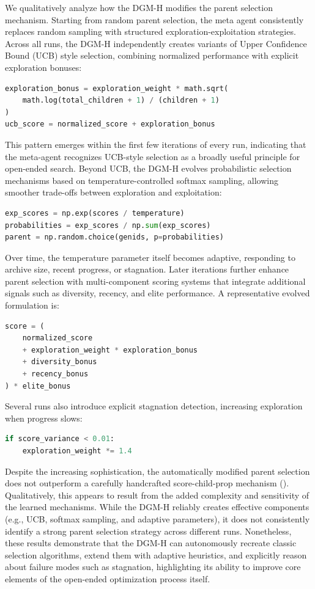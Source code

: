 \documentclass[]{fairmeta}
\begin{document}
We qualitatively analyze how the DGM-H modifies the parent selection mechanism. Starting from random parent selection, the meta agent consistently replaces random sampling with structured exploration-exploitation strategies. Across all runs, the DGM-H independently creates variants of Upper Confidence Bound (UCB) \citep{auer2002finite} style selection, combining normalized performance with explicit exploration bonuses:
\begin{lstlisting}[language=Python]
exploration_bonus = exploration_weight * math.sqrt(
    math.log(total_children + 1) / (children + 1)
)
ucb_score = normalized_score + exploration_bonus
\end{lstlisting}
This pattern emerges within the first few iterations of every run, indicating that the meta-agent recognizes UCB-style selection as a broadly useful principle for open-ended search. Beyond UCB, the DGM-H evolves probabilistic selection mechanisms based on temperature-controlled softmax sampling, allowing smoother trade-offs between exploration and exploitation:
\begin{lstlisting}[language=Python]
exp_scores = np.exp(scores / temperature)
probabilities = exp_scores / np.sum(exp_scores)
parent = np.random.choice(genids, p=probabilities)
\end{lstlisting}
Over time, the temperature parameter itself becomes adaptive, responding to archive size, recent progress, or stagnation. Later iterations further enhance parent selection with multi-component scoring systems that integrate additional signals such as diversity, recency, and elite performance. A representative evolved formulation is:
\begin{lstlisting}[language=Python]
score = (
    normalized_score
    + exploration_weight * exploration_bonus
    + diversity_bonus
    + recency_bonus
) * elite_bonus
\end{lstlisting}
Several runs also introduce explicit stagnation detection, increasing exploration when progress slows:
\begin{lstlisting}[language=Python]
if score_variance < 0.01:
    exploration_weight *= 1.4
\end{lstlisting}

Despite the increasing sophistication, the automatically modified parent selection does not outperform a carefully handcrafted score-child-prop mechanism (). Qualitatively, this appears to result from the added complexity and sensitivity of the learned mechanisms. While the DGM-H reliably creates effective components (e.g., UCB, softmax sampling, and adaptive parameters), it does not consistently identify a strong parent selection strategy across different runs. Nonetheless, these results demonstrate that the DGM-H can autonomously recreate classic selection algorithms, extend them with adaptive heuristics, and explicitly reason about failure modes such as stagnation, highlighting its ability to improve core elements of the open-ended optimization process itself.
\end{document}
